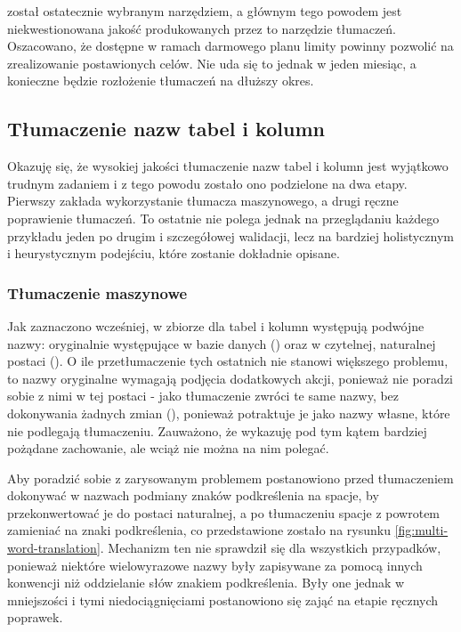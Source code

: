  został ostatecznie wybranym narzędziem, a głównym tego powodem jest niekwestionowana jakość produkowanych przez to narzędzie tłumaczeń. Oszacowano, że dostępne w ramach darmowego planu limity powinny pozwolić na zrealizowanie postawionych celów. Nie uda się to jednak w jeden miesiąc, a konieczne będzie rozłożenie tłumaczeń na dłuższy okres.

\subsection{Tłumaczenie nazw tabel i kolumn}
Okazuję się, że wysokiej jakości tłumaczenie nazw tabel i kolumn jest wyjątkowo trudnym zadaniem i z tego powodu zostało ono podzielone na dwa etapy. Pierwszy zakłada wykorzystanie tłumacza maszynowego, a drugi ręczne poprawienie tłumaczeń. To ostatnie nie polega jednak na przeglądaniu każdego przykładu jeden po drugim i szczegółowej walidacji, lecz na bardziej holistycznym i heurystycznym podejściu, które zostanie dokładnie opisane.

\subsubsection{Tłumaczenie maszynowe}
Jak zaznaczono wcześniej, w zbiorze  dla tabel i kolumn występują podwójne nazwy: oryginalnie występujące w bazie danych () oraz w czytelnej, naturalnej postaci (). O ile przetłumaczenie tych ostatnich nie stanowi większego problemu, to nazwy oryginalne wymagają podjęcia dodatkowych akcji, ponieważ  nie poradzi sobie z nimi w tej postaci - jako tłumaczenie zwróci te same nazwy, bez dokonywania żadnych zmian (), ponieważ potraktuje je jako nazwy własne, które nie podlegają tłumaczeniu. Zauważono, że  wykazuję pod tym kątem bardziej pożądane zachowanie, ale wciąż nie można na nim polegać. 

Aby poradzić sobie z zarysowanym problemem postanowiono przed tłumaczeniem dokonywać w nazwach podmiany znaków podkreślenia na spacje, by przekonwertować je do postaci naturalnej, a po tłumaczeniu spacje z powrotem zamieniać na znaki podkreślenia, co przedstawione zostało na rysunku \ref{fig:multi-word-translation}. Mechanizm ten nie sprawdził się dla wszystkich przypadków, ponieważ niektóre wielowyrazowe nazwy były zapisywane za pomocą innych konwencji niż oddzielanie słów znakiem podkreślenia. Były one jednak w mniejszości i tymi niedociągnięciami postanowiono się zająć na etapie ręcznych poprawek.

